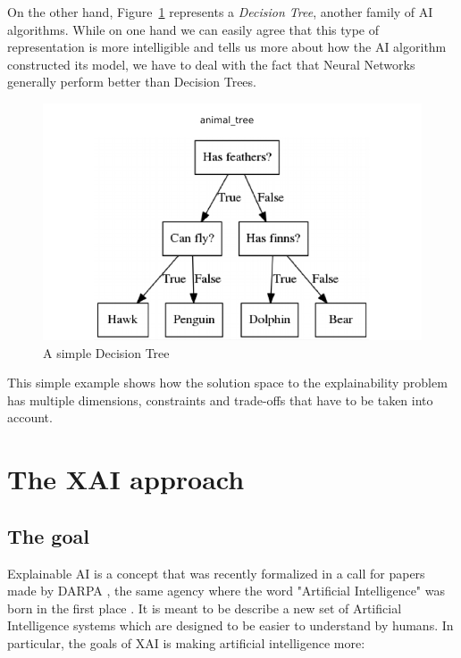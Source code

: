 \documentclass[conference]{IEEEtran}
\newcommand{\cit}[1][]{\todo[tickmarkheight=0.2cm]{cit #1}}
\begin{document}
On the other hand, Figure~\ref{fig:dectree} represents a \textit{Decision Tree},
another family of AI algorithms. While on one hand we can easily agree that this
type of representation is more intelligible and tells us more about how the AI
algorithm constructed its model, we have to deal with the fact that Neural
Networks generally perform better than Decision Trees.

\begin{figure}[ht!] \centering
    \includegraphics[width=0.9\linewidth]{images/dectree} \caption{A simple
        Decision Tree} \label{fig:dectree} \end{figure}

This simple example shows how the solution space to the explainability problem
has multiple dimensions, constraints and trade-offs that have to be taken into
account.

\section{The XAI approach}
\label{sec:xai}

\subsection{The goal}

Explainable AI is a concept that was recently formalized in a call for papers
 made by DARPA \cit, the
same agency where the word "Artificial Intelligence" was born in the first place
\cit. It is meant to be describe a new set of Artificial Intelligence systems
which are designed to be easier to understand by humans. In particular, the
goals of XAI is making artificial intelligence more:
\end{document}
